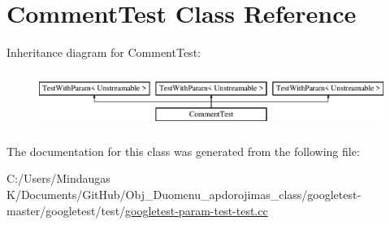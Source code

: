 \hypertarget{class_comment_test}{}\section{Comment\+Test Class Reference}
\label{class_comment_test}
Inheritance diagram for Comment\+Test\+:\begin{figure}[H]
\begin{center}
\leavevmode
\includegraphics[height=1.839080cm]{d6/df6/class_comment_test}
\end{center}
\end{figure}


The documentation for this class was generated from the following file\+:\begin{DoxyCompactItemize}
\item 
C\+:/\+Users/\+Mindaugas K/\+Documents/\+Git\+Hub/\+Obj\+\_\+\+Duomenu\+\_\+apdorojimas\+\_\+class/googletest-\/master/googletest/test/\mbox{\hyperlink{googletest-master_2googletest_2test_2googletest-param-test-test_8cc}{googletest-\/param-\/test-\/test.\+cc}}\end{DoxyCompactItemize}
